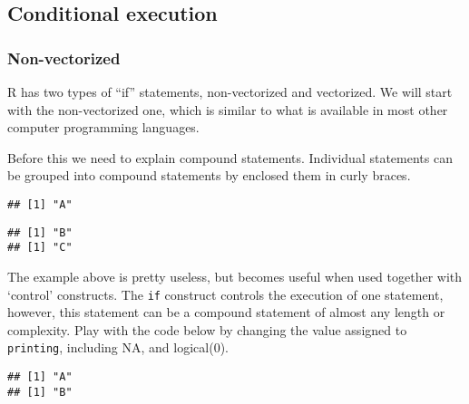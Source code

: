 \documentclass[paper=a4,headsepline,BCOR=12mm,twoside,open=right,%
titlepage,headings=small,fontsize=10pt,index=totoc,bibliography=totoc,%
captions=tableheading,captions=nooneline]{scrbook}\usepackage{knitr}
\begin{document}
\subsection{Conditional execution}

\subsubsection{Non-vectorized}

R has two types of ``if'' statements, non-vectorized and vectorized. We will start with the non-vectorized one, which is similar to what is available in most other computer programming languages.

Before this we need to explain compound statements. Individual statements can be grouped into compound statements by enclosed them in curly braces.

\begin{knitrout}\footnotesize
{}\color{fgcolor}\begin{kframe}
\begin{alltt}
\hlstd{(}\hlstd{)}
\end{alltt}
\begin{verbatim}
## [1] "A"
\end{verbatim}
\begin{alltt}
\hlstd{\{}
  \hlstd{(}\hlstd{)}
  \hlstd{(}\hlstd{)}
\hlstd{\}}
\end{alltt}
\begin{verbatim}
## [1] "B"
## [1] "C"
\end{verbatim}
\end{kframe}
\end{knitrout}

The example above is pretty useless, but becomes useful when used together with `control' constructs. The \texttt{if} construct controls the execution of one statement, however, this statement can be a compound statement of almost any length or complexity. Play with the code below by changing the value assigned to \texttt{printing}, including NA, and logical(0).

\begin{knitrout}\footnotesize
{}\color{fgcolor}\begin{kframe}
\begin{alltt}
 \hlkwb{<-} 
 
  \hlstd{(}\hlstd{)}
  \hlstd{(}\hlstd{)}
\hlstd{\}}
\end{alltt}
\begin{verbatim}
## [1] "A"
## [1] "B"
\end{verbatim}
\end{kframe}
\end{knitrout}
\end{document}
